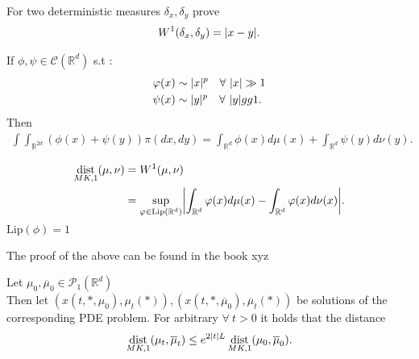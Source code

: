 \begin{exercise}
 For two deterministic measures $\delta_x,\delta_y$ prove 
 \begin{align*}
  W^{1}(\delta_x,\delta_y)  = \lvert x - y\rvert
 .\end{align*}
\end{exercise}
\begin{remark}
 If $\phi , \psi \in  \mathcal{C}(\mathbb{R}^{d} )$  s.t :
 \begin{align*}
   \varphi(x) &\sim  \lvert x\rvert^{p}  \quad \forall \ \lvert x\rvert \gg 1 \\
   \psi(x) &\sim  \lvert y\rvert^{p}  \quad \forall \ \lvert y\rvert gg 1
 .\end{align*}
 Then 
 \begin{align*}
   \int \int_{\mathbb{R}^{2d} } (\phi(x) + \psi(y)) \pi(dx,dy) = \int_{\mathbb{R}^{d } } \phi(x) d\mu(x) + \int_{\mathbb{R}^{d} } \psi(y) d\nu(y)
 . \end{align*}
\end{remark}
\begin{corollary}
 \begin{align*}
   \dist_{MK,1}(\mu ,\nu ) &= W^{1}(\mu ,\nu )  \\
                           &= \sup_{\phi \in  \text{Lip}(\mathbb{R}^{d} )} \abs*{\int_{\mathbb{R}^{d} } \phi(x) d\mu(x) - \int_{\mathbb{R}^{d} } \phi(x) d\nu(x)}
 .\end{align*} 
 $\text{Lip}(\phi ) = 1$
\end{corollary}
The proof of the above can be found in the book xyz
\begin{theorem}
  Let $\mu_{0},\overline{\mu }_0  \in  \mathcal{P}_1(\mathbb{R}^{d } )$\\
  Then let $(x(t,*,\mu_0),\mu_t(*)),(x(t,*,\overline{\mu }_0 ),\overline{\mu }_t(*) )$ be solutions of 
  the corresponding PDE problem. For arbitrary $\forall\ t >0$ it holds that the distance 
  \begin{align*}
    \operatorname*{dist}_{MK,1}(\mu_t,\overline{\mu }_t ) \le e^{2\lvert t\rvert L} \operatorname*{dist}_{MK,1}(\mu_0,\overline{\mu }_0 )
  .\end{align*} 
\end{theorem}
